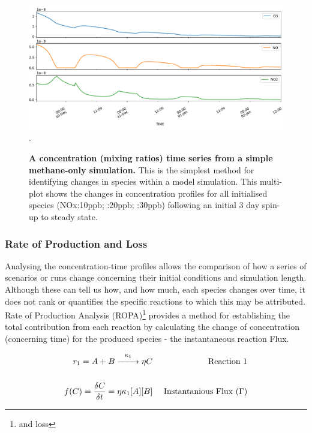 \begin{figure}[H]
     \centering
         \includegraphics[width=.85\textwidth]{figures/ch2concentration.pdf}\\
         .
        \caption{\textbf{A concentration (mixing ratios) time series from a simple methane-only simulation.} This is the simplest method for identifying changes in species within a model simulation. This multi-plot shows the changes in concentration profiles for all initialised species (NOx:10ppb; :20ppb; :30ppb) following an initial 3 day spin-up to steady state. }
        \label{fig:concentration}
\end{figure}

\subsubsection{Rate of Production and Loss}

Analysing the concentration-time profiles allows the comparison of how a series of scenarios or runs change concerning their initial conditions and simulation length. Although these can tell us how, and how much, each species changes over time, it does not rank or quantifies the specific reactions to which this may be attributed. Rate of Production Analysis (ROPA)\footnote{and loss} provides a method for establishing the total contribution from each reaction by calculating the change of concentration (concerning time) for the produced species - the instantaneous reaction Flux.

\begin{eqnarray}
  r_1 = A + B \overset{\kappa_1}{\xrightarrow{\hspace*{7mm}}} \eta C & & \text{ Reaction 1}\\[15pt]
  f(C) = \dfrac{\delta C}{\delta t} =  \eta  \kappa_1 [A][B]                     & & \text{ Instantanious Flux }(\Gamma) \label{eqn:ode}
\end{eqnarray}

